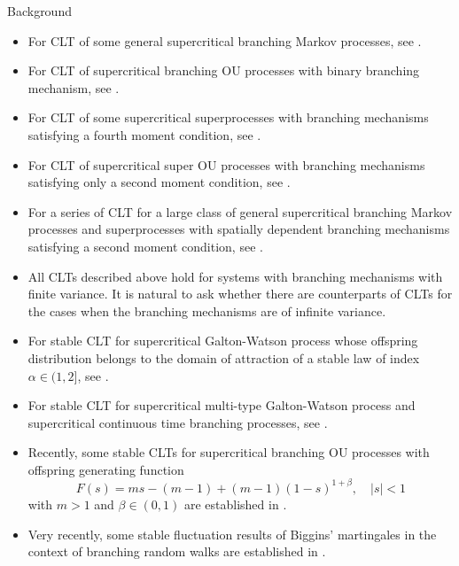 \documentclass[9pt]{beamer}
\begin{document}
\begin{frame}[allowframebreaks]{Background}
\begin{itemize}
\item
	For CLT of some general supercritical {\color{red} branching Markov processes}, see \cite{AsmussenHering1983Branching}.
\item
	For CLT of supercritical {\color{red} branching OU processes} with {\color{red} binary branching} mechanism, see \cite{AdamczakMilos2015CLT}.
\item
	For CLT of some supercritical {\color{red} superprocesses} with branching mechanisms satisfying a {\color{red} fourth moment condition}, see \cite{Milos2018Spatial}.
\item
	For CLT of supercritical {\color{red} super OU processes} with branching mechanisms satisfying only a  {\color{red} second moment condition}, see \cite{RenSongZhang2014Central}.
\item
	For a series of CLT for a large class of general supercritical {\color{red} branching Markov processes} and {\color{red} superprocesses} with {\color{red} spatially dependent branching mechanisms} satisfying a {\color{red} second moment condition}, see \cite{RenSongZhang2014CentralB,RenSongZhang2015Central,RenSongZhang2017Central}.
\item
    All CLTs described above hold for systems with branching mechanisms with finite variance. 
    It is natural to ask whether there are counterparts of CLTs for the cases when the branching mechanisms are of infinite variance.
\item
	For stable CLT for supercritical {\color{red} Galton-Watson process} whose {\color{red} offspring distribution
    belongs to the domain of attraction of a stable law of index $\alpha\in (1, 2]$}, see \cite{Heyde1971Some}.
\item
	For stable CLT for supercritical {\color{red} multi-type Galton-Watson process} and supercritical {\color{red} continuous time branching processes}, see \cite{Asmussen1976Convergence}.
\item
	Recently, some stable CLTs for supercritical {\color{red} branching OU processes} with offspring generating function
\[
    F(s)
    = ms -(m-1) +(m-1) (1-s)^{1+\beta},
    \quad |s|< 1
\]
	with $m>1$ and $\beta\in (0, 1)$ are established in \cite{MarksMilos2018CLT}.
\item
	Very recently, some stable fluctuation results of Biggins’ martingales in the context of {\color{red} branching random walks} are established in \cite{IksanovKoleskoMeiners2018Fluctuations}.
\end{itemize}
\end{frame}
\end{document}
